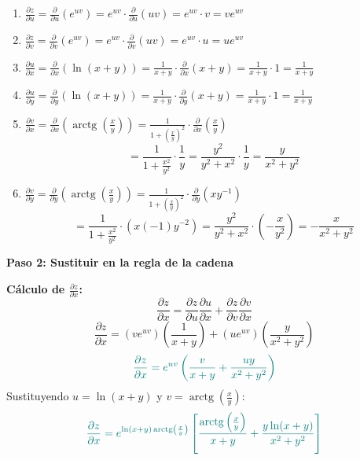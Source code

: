 \documentclass{article}
\begin{document}
\begin{enumerate}
    \item $\displaystyle \frac{\partial z}{\partial u} = \frac{\partial}{\partial u} (e^{uv}) = e^{uv} \cdot \frac{\partial}{\partial u}(uv) = e^{uv} \cdot v = v e^{uv}$

    \item $\displaystyle \frac{\partial z}{\partial v} = \frac{\partial}{\partial v} (e^{uv}) = e^{uv} \cdot \frac{\partial}{\partial v}(uv) = e^{uv} \cdot u = u e^{uv}$

    \item $\displaystyle \frac{\partial u}{\partial x} = \frac{\partial}{\partial x} (\ln(x+y)) = \frac{1}{x+y} \cdot \frac{\partial}{\partial x}(x+y) = \frac{1}{x+y} \cdot 1 = \frac{1}{x+y}$

    \item $\displaystyle \frac{\partial u}{\partial y} = \frac{\partial}{\partial y} (\ln(x+y)) = \frac{1}{x+y} \cdot \frac{\partial}{\partial y}(x+y) = \frac{1}{x+y} \cdot 1 = \frac{1}{x+y}$

    \item $\displaystyle \frac{\partial v}{\partial x} = \frac{\partial}{\partial x} \left( \operatorname{arctg}\left(\frac{x}{y}\right) \right) = \frac{1}{1 + \left(\frac{x}{y}\right)^2} \cdot \frac{\partial}{\partial x}\left(\frac{x}{y}\right)$
    \[
    = \frac{1}{1 + \frac{x^2}{y^2}} \cdot \frac{1}{y} = \frac{y^2}{y^2 + x^2} \cdot \frac{1}{y} = \frac{y}{x^2 + y^2}
    \]

    \item $\displaystyle \frac{\partial v}{\partial y} = \frac{\partial}{\partial y} \left( \operatorname{arctg}\left(\frac{x}{y}\right) \right) = \frac{1}{1 + \left(\frac{x}{y}\right)^2} \cdot \frac{\partial}{\partial y}\left(x y^{-1}\right)$
    \[
    = \frac{1}{1 + \frac{x^2}{y^2}} \cdot (x (-1) y^{-2}) = \frac{y^2}{y^2 + x^2} \cdot \left(-\frac{x}{y^2}\right) = -\frac{x}{x^2 + y^2}
    \]
\end{enumerate}

\vspace{1em}

\textbf{Paso 2: Sustituir en la regla de la cadena}

\textbf{Cálculo de $\frac{\partial z}{\partial x}$:}
\[
\frac{\partial z}{\partial x} = \frac{\partial z}{\partial u} \frac{\partial u}{\partial x} + \frac{\partial z}{\partial v} \frac{\partial v}{\partial x}
\]
\[
\frac{\partial z}{\partial x} = (v e^{uv}) \left( \frac{1}{x+y} \right) + (u e^{uv}) \left( \frac{y}{x^2 + y^2} \right)
\]
\[ \color{teal}
\frac{\partial z}{\partial x} = e^{uv} \left( \frac{v}{x+y} + \frac{uy}{x^2 + y^2} \right)
\]
Sustituyendo $u = \ln(x+y)$ y $v = \operatorname{arctg}\left(\frac{x}{y}\right)$:
\[\color{teal}
{
\frac{\partial z}{\partial x} = e^{\ln(x+y) \operatorname{arctg}\left(\frac{x}{y}\right)} \left[ \frac{\operatorname{arctg}\left(\frac{x}{y}\right)}{x+y} + \frac{y \ln(x+y)}{x^2 + y^2} \right]
}
\]
\end{document}
